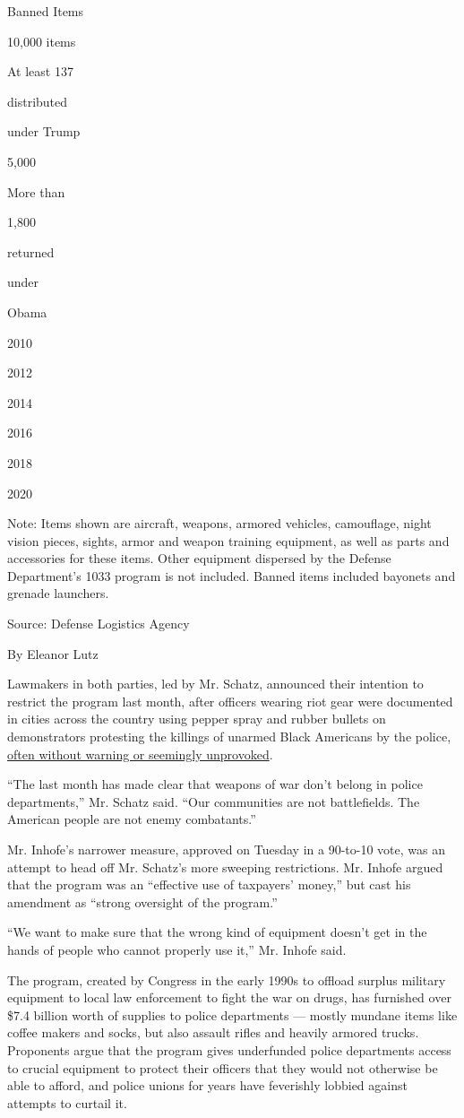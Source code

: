 Banned Items

10,000 items

At least 137

distributed

under Trump

5,000

More than

1,800

returned

under

Obama

2010

2012

2014

2016

2018

2020

Note: Items shown are aircraft, weapons, armored vehicles, camouflage,
night vision pieces, sights, armor and weapon training equipment, as
well as parts and accessories for these items. Other equipment dispersed
by the Defense Department's 1033 program is not included. Banned items
included bayonets and grenade launchers.

Source: Defense Logistics Agency

By Eleanor Lutz

Lawmakers in both parties, led by Mr. Schatz, announced their intention
to restrict the program last month, after officers wearing riot gear
were documented in cities across the country using pepper spray and
rubber bullets on demonstrators protesting the killings of unarmed Black
Americans by the police,
\href{https://www.nytimes.com/2020/05/31/us/police-tactics-floyd-protests.html}{often
without warning or seemingly unprovoked}.

``The last month has made clear that weapons of war don't belong in
police departments,'' Mr. Schatz said. ``Our communities are not
battlefields. The American people are not enemy combatants.''

Mr. Inhofe's narrower measure, approved on Tuesday in a 90-to-10 vote,
was an attempt to head off Mr. Schatz's more sweeping restrictions. Mr.
Inhofe argued that the program was an ``effective use of taxpayers'
money,'' but cast his amendment as ``strong oversight of the program.''

``We want to make sure that the wrong kind of equipment doesn't get in
the hands of people who cannot properly use it,'' Mr. Inhofe said.

The program, created by Congress in the early 1990s to offload surplus
military equipment to local law enforcement to fight the war on drugs,
has furnished over \$7.4 billion worth of supplies to police departments
--- mostly mundane items like coffee makers and socks, but also assault
rifles and heavily armored trucks. Proponents argue that the program
gives underfunded police departments access to crucial equipment to
protect their officers that they would not otherwise be able to afford,
and police unions for years have feverishly lobbied against attempts to
curtail it.


